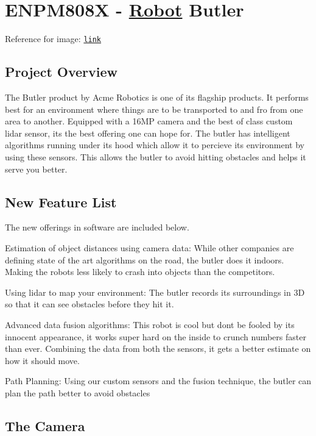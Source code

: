 \section*{E\+N\+P\+M808X -\/ \hyperlink{class_robot}{Robot} Butler }

\href{https://travis-ci.org/karanvivekbhargava/robot-butler-enpm808x}{\tt } \href{https://coveralls.io/github/karanvivekbhargava/robot-butler-enpm808x?branch=master}{\tt } \href{https://opensource.org/licenses/MIT}{\tt } 

 Reference for image\+: \href{http://www.savioke.com/}{\tt link} 

\subsection*{Project Overview}

The Butler product by Acme Robotics is one of its flagship products. It performs best for an environment where things are to be transported to and fro from one area to another. Equipped with a 16\+MP camera and the best of class custom lidar sensor, its the best offering one can hope for. The butler has intelligent algorithms running under its hood which allow it to percieve its environment by using these sensors. This allows the butler to avoid hitting obstacles and helps it serve you better.

\subsection*{New Feature List}

The new offerings in software are included below.
\begin{DoxyItemize}
\item Estimation of object distances using camera data\+: While other companies are defining state of the art algorithms on the road, the butler does it indoors. Making the robots less likely to crash into objects than the competitors.
\item Using lidar to map your environment\+: The butler records its surroundings in 3D so that it can see obstacles before they hit it.
\item Advanced data fusion algorithms\+: This robot is cool but don\textquotesingle{}t be fooled by its innocent appearance, it works super hard on the inside to crunch numbers faster than ever. Combining the data from both the sensors, it gets a better estimate on how it should move.
\item Path Planning\+: Using our custom sensors and the fusion technique, the butler can plan the path better to avoid obstacles 

 \subsection*{The Camera}
\end{DoxyItemize}

